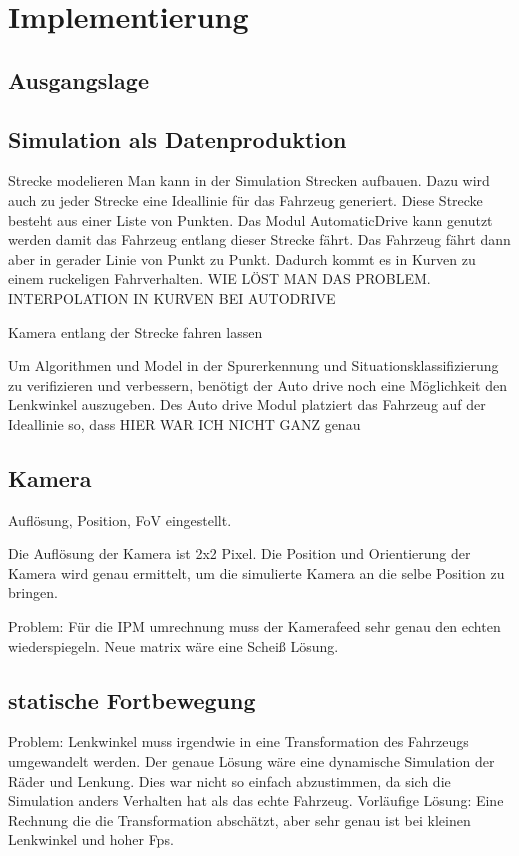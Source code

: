 
\chapter{Implementierung}

\section{Ausgangslage}

\section{Simulation als Datenproduktion}
Strecke modelieren
Man kann in der Simulation Strecken aufbauen. Dazu wird auch zu jeder Strecke eine Ideallinie für das Fahrzeug generiert.
Diese Strecke besteht aus einer Liste von Punkten.
Das Modul AutomaticDrive kann genutzt werden damit das Fahrzeug entlang dieser Strecke fährt.
Das Fahrzeug fährt dann aber in gerader Linie von Punkt zu Punkt. 
Dadurch kommt es in Kurven zu einem ruckeligen Fahrverhalten.
WIE LÖST MAN DAS PROBLEM. INTERPOLATION IN KURVEN BEI AUTODRIVE

Kamera entlang der Strecke fahren lassen

Um Algorithmen und Model in der Spurerkennung und Situationsklassifizierung zu verifizieren und verbessern, 
benötigt der Auto drive noch eine Möglichkeit den Lenkwinkel auszugeben.
Des Auto drive Modul platziert das Fahrzeug auf der Ideallinie so, dass 
HIER WAR ICH NICHT GANZ genau



\section{Kamera}
Auflösung, Position, FoV eingestellt.

Die Auflösung der Kamera ist 2x2 Pixel.
Die Position und Orientierung der Kamera wird genau ermittelt, um die simulierte Kamera an die selbe Position zu bringen.
 

Problem: Für die IPM umrechnung muss der Kamerafeed sehr genau den echten wiederspiegeln.
Neue matrix wäre eine Scheiß Lösung.


\section{statische Fortbewegung}
Problem: Lenkwinkel muss irgendwie in eine Transformation des Fahrzeugs umgewandelt werden.
Der genaue Lösung wäre eine dynamische Simulation der Räder und Lenkung.
Dies war nicht so einfach abzustimmen, da sich die Simulation anders Verhalten hat als das echte Fahrzeug.
Vorläufige Lösung: Eine Rechnung die die Transformation abschätzt, aber sehr genau ist bei kleinen Lenkwinkel und hoher Fps.

